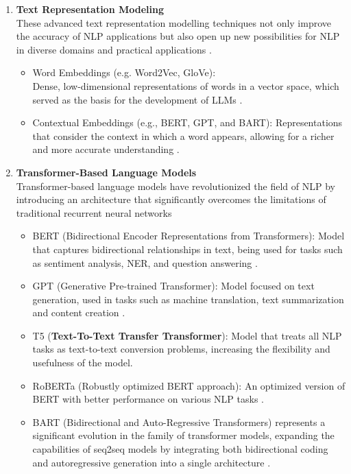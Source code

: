 \begin{enumerate}
 \item \textbf{Text Representation Modeling}\\
 These advanced text representation modelling techniques not only improve the accuracy of NLP applications but also open up new possibilities for NLP in diverse domains and practical applications \cite{Devlin2019}.
 \begin{itemize}
 \item Word Embeddings (e.g. Word2Vec, GloVe):\\Dense, low-dimensional representations of words in a vector space, which served as the basis for the development of LLMs \cite{acheampong2021transformer}.
 \item Contextual Embeddings (e.g., BERT, GPT, and BART): Representations that consider the context in which a word appears, allowing for a richer and more accurate understanding \cite{devlin2018bert}.
 \end{itemize}
\item\textbf{Transformer-Based Language Models}\\
 Transformer-based language models have revolutionized the field of NLP by introducing an architecture that significantly overcomes the limitations of traditional recurrent neural networks \cite{vaswani2017}
 \begin{itemize}
 \item BERT (Bidirectional Encoder Representations from Transformers): Model that captures bidirectional relationships in text, being used for tasks such as sentiment analysis, NER, and question answering \cite{devlin2018bert}.
 \item GPT (Generative Pre-trained Transformer): Model focused on text generation, used in tasks such as machine translation, text summarization and content creation \cite{Khurana2023}.
 \item T5 (\textbf{Text-To-Text Transfer Transformer}): Model that treats all NLP tasks as text-to-text conversion problems, increasing the flexibility and usefulness of the \cite{Khurana2023} model.
 \item RoBERTa (Robustly optimized BERT approach): An optimized version of BERT with better performance on various NLP tasks \cite{polignano2019alberto}.
 \item BART (Bidirectional and Auto-Regressive Transformers) represents a significant evolution in the family of transformer models, expanding the capabilities of seq2seq models by integrating both bidirectional coding and autoregressive generation into a single architecture \cite{belzner2023large}.

\end{itemize}
\end{enumerate}
